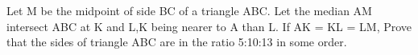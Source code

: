 \item Let M be the midpoint of side BC of a triangle ABC. Let the median AM intersect ABC  at K and L,K being nearer to A than L. If AK = KL = LM, Prove that the sides of triangle ABC are in the ratio 5:10:13 in some order.
























